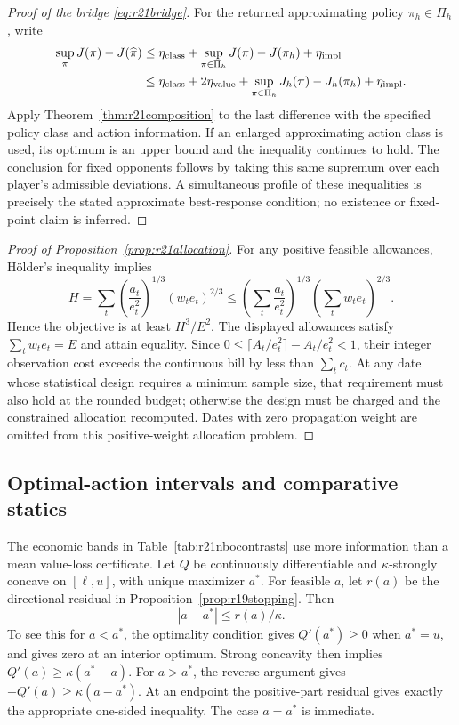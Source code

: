\begin{proof}[Proof of the bridge \eqref{eq:r21bridge}]
For the returned approximating policy $\pi_h\in\Pi_h$, write
\begin{align*}
 \sup_\pi J(\pi)-J(\widehat\pi)
 &\leq\eta_{\rm class}
       +\sup_{\pi\in\Pi_h}J(\pi)-J(\pi_h)+\eta_{\rm impl}\\
 &\leq\eta_{\rm class}+2\eta_{\rm value}
       +\sup_{\pi\in\Pi_h}J_h(\pi)-J_h(\pi_h)+\eta_{\rm impl}.
\end{align*}
Apply Theorem~\ref{thm:r21composition} to the last difference with the
specified policy class and action information. If an enlarged approximating
action class is used, its optimum is an upper bound and the inequality
continues to hold. The conclusion for fixed opponents follows by taking this
same supremum over each player's admissible deviations. A simultaneous
profile of these inequalities is precisely the stated approximate
best-response condition; no existence or fixed-point claim is inferred.
\end{proof}

\begin{proof}[Proof of Proposition~\ref{prop:r21allocation}]
For any positive feasible allowances, H\"older's inequality implies
\[
 H=\sum_t\left(\frac{a_t}{e_t^2}\right)^{1/3}
                    (w_te_t)^{2/3}
 \leq\left(\sum_t\frac{a_t}{e_t^2}\right)^{1/3}
                    \left(\sum_tw_te_t\right)^{2/3}.
\]
Hence the objective is at least $H^3/E^2$. The displayed allowances satisfy
$\sum_tw_te_t=E$ and attain equality. Since
$0\leq\lceil A_t/e_t^2\rceil-A_t/e_t^2<1$, their integer observation cost
exceeds the continuous bill by less than $\sum_tc_t$. At any date whose
statistical design requires a minimum sample size, that requirement must
also hold at the rounded budget; otherwise the design must be charged and
the constrained allocation recomputed. Dates with zero propagation weight
are omitted from this positive-weight allocation problem.
\end{proof}

\subsection{Optimal-action intervals and comparative statics}
The economic bands in Table~\ref{tab:r21nbocontrasts} use more information
than a mean value-loss certificate. Let $Q$ be continuously differentiable
and $\kappa$-strongly concave on $[\ell,u]$, with unique maximizer $a^*$.
For feasible $a$, let $r(a)$ be the directional residual in
Proposition~\ref{prop:r19stopping}. Then
\begin{equation}
 |a-a^*|\leq r(a)/\kappa.
 \label{eq:r21actionradius}
\end{equation}
To see this for $a<a^*$, the optimality condition gives $Q'(a^*)\geq0$
when $a^*=u$, and gives zero at an interior optimum. Strong concavity then
implies $Q'(a)\geq\kappa(a^*-a)$. For $a>a^*$, the reverse argument gives
$-Q'(a)\geq\kappa(a-a^*)$. At an endpoint the positive-part residual gives
exactly the appropriate one-sided inequality. The case $a=a^*$ is immediate.

